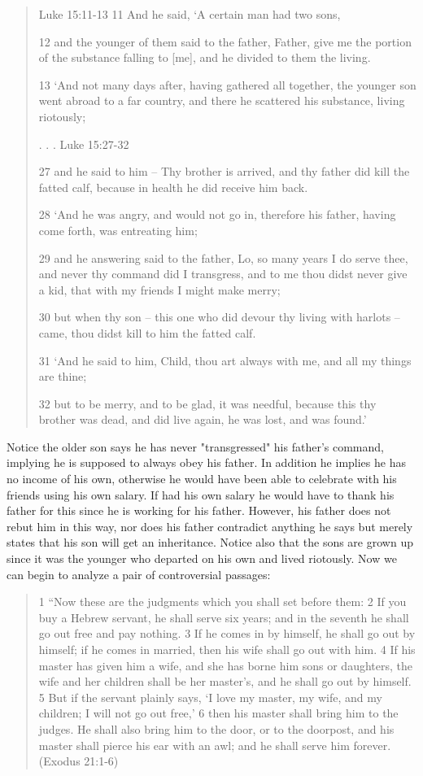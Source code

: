 \documentclass[11pt]{article}
\begin{document}
\begin{quote}
Luke 15:11-13
11 And he said, `A certain man had two sons,

12 and the younger of them said to the father, Father, give me the portion of the substance falling to [me], and he divided to them the living.

13 `And not many days after, having gathered all together, the younger son went abroad to a far country, and there he scattered his substance, living riotously;

. . . 
Luke 15:27-32

27 and he said to him -- Thy brother is arrived, and thy father did kill the fatted calf, because in health he did receive him back.

28 `And he was angry, and would not go in, therefore his father, having come forth, was entreating him;

29 and he answering said to the father, Lo, so many years I do serve thee, and never thy command did I transgress, and to me thou didst never give a kid, that with my friends I might make merry;

30 but when thy son -- this one who did devour thy living with harlots -- came, thou didst kill to him the fatted calf.

31 `And he said to him, Child, thou art always with me, and all my things are thine;

32 but to be merry, and to be glad, it was needful, because this thy brother was dead, and did live again, he was lost, and was found.' 
\end{quote}

Notice the older son says he has never "transgressed" his father's command, implying he is supposed to always obey his father. In addition he implies he has no income of his own, otherwise he would have been able to celebrate with his friends using his own salary. If had his own salary he would have to thank his father for this since he is working for his father. However, his father does not rebut him in this way, nor does his father contradict anything he says but merely states that his son will get an inheritance. Notice also that the sons are grown up since it was the younger who departed on his own and lived riotously. Now we can begin to analyze a pair of controversial passages:

\begin{quote}
1 “Now these are the judgments which you shall set before them: 2 If you buy a Hebrew servant, he shall serve six years; and in the seventh he shall go out free and pay nothing. 3 If he comes in by himself, he shall go out by himself; if he comes in married, then his wife shall go out with him. 4 If his master has given him a wife, and she has borne him sons or daughters, the wife and her children shall be her master’s, and he shall go out by himself. 5 But if the servant plainly says, ‘I love my master, my wife, and my children; I will not go out free,’ 6 then his master shall bring him to the judges. He shall also bring him to the door, or to the doorpost, and his master shall pierce his ear with an awl; and he shall serve him forever. (Exodus 21:1-6)
\end{quote}
\end{document}
